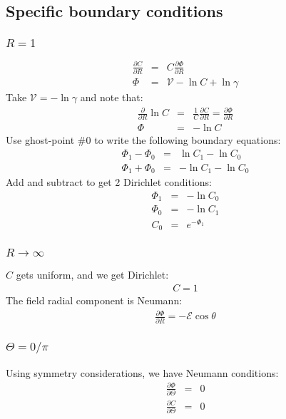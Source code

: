 \subsection{Specific boundary conditions}
\subsubsection{$R = 1$}
\begin{eqnarray}
  \frac{\partial C}{\partial R} &=&
   C \frac{\partial \varPhi}{\partial R} \\
  \varPhi &=& \mathscr{V} - \ln C + \ln \gamma
\end{eqnarray}
Take $\mathscr{V} = -\ln \gamma$ and note that:
\begin{eqnarray}
  \frac{\partial}{\partial R} \ln C &=&
  \frac{1}{C}\frac{\partial C}{\partial R} =
  \frac{\partial \varPhi}{\partial R} \\
  \varPhi &=& -\ln C
\end{eqnarray}
Use ghost-point \#0 to write the following boundary equations:
\begin{eqnarray}
  \varPhi_1 - \varPhi_0 &=& \ln C_1 - \ln C_0 \\
  \varPhi_1 + \varPhi_0 &=& - \ln C_1 - \ln C_0
\end{eqnarray}
Add and subtract to get 2 Dirichlet conditions:
\begin{eqnarray}
  \varPhi_1 &=& - \ln C_0 \\
  \varPhi_0 &=& - \ln C_1 \\
  C_0 &=& e^{-\varPhi_1}
\end{eqnarray}
\subsubsection{$R \rightarrow \infty$}
$C$ gets uniform, and we get Dirichlet:
\begin{eqnarray}
 C = 1
\end{eqnarray}
The field radial component is Neumann:
\begin{eqnarray}
 \frac{\partial \varPhi}{\partial R} = -\mathscr{E} \cos \theta
\end{eqnarray}
\subsubsection{$\Theta = 0/\pi$}
Using symmetry considerations, we have Neumann conditions:
\begin{eqnarray}
 \frac{\partial \varPhi}{\partial \Theta} &=& 0 \\
 \frac{\partial C}{\partial \Theta} &=& 0 \\
\end{eqnarray}

